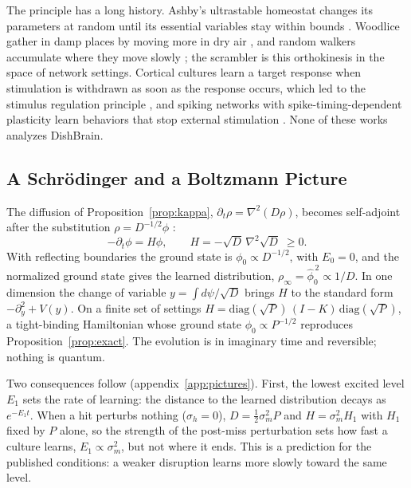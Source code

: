 \documentclass[12pt]{article}
\numberwithin{equation}{section}
\begin{document}
The principle has a long history. Ashby's ultrastable homeostat changes its parameters at random until its essential variables stay within bounds \citep{Ashby1952}. Woodlice gather in damp places by moving more in dry air \citep{Gunn1937}, and random walkers accumulate where they move slowly \citep{Schnitzer1993}; the scrambler is this orthokinesis in the space of network settings. Cortical cultures learn a target response when stimulation is withdrawn as soon as the response occurs, which led to the stimulus regulation principle \citep{Shahaf2001,Marom2002}, and spiking networks with spike-timing-dependent plasticity learn behaviors that stop external stimulation \citep{Sinapayen2017,Masumori2020}. None of these works analyzes DishBrain.

\subsection{A Schr\"odinger and a Boltzmann Picture}\label{sec:pictures}

The diffusion of Proposition~\ref{prop:kappa}, $\partial_t\rho=\nabla^2(D\rho)$, becomes self-adjoint after the substitution $\rho=D^{-1/2}\phi$ \citep{Risken1989}:
\begin{equation}
-\partial_t\phi=H\phi,\qquad H=-\sqrt{D}\,\nabla^2\sqrt{D}\;\ge0 .
\label{eq:H}
\end{equation}
With reflecting boundaries the ground state is $\phi_0\propto D^{-1/2}$, with $E_0=0$, and the normalized ground state gives the learned distribution, $\rho_\infty=\hat\phi_0^{\,2}\propto1/D$. In one dimension the change of variable $y=\int d\psi/\sqrt{D}$ brings $H$ to the standard form $-\partial_y^2+V(y)$. On a finite set of settings $H=\mathrm{diag}(\sqrt P)\,(I-K)\,\mathrm{diag}(\sqrt P)$, a tight-binding Hamiltonian whose ground state $\phi_0\propto P^{-1/2}$ reproduces Proposition~\ref{prop:exact}. The evolution is in imaginary time and reversible; nothing is quantum.

Two consequences follow (appendix~\ref{app:pictures}). First, the lowest excited level $E_1$ sets the rate of learning: the distance to the learned distribution decays as $e^{-E_1t}$. When a hit perturbs nothing ($\sigma_h=0$), $D=\tfrac12\sigma_m^2P$ and $H=\sigma_m^2H_1$ with $H_1$ fixed by $P$ alone, so the strength of the post-miss perturbation sets how fast a culture learns, $E_1\propto\sigma_m^2$, but not where it ends. This is a prediction for the published conditions: a weaker disruption learns more slowly toward the same level.
\end{document}
